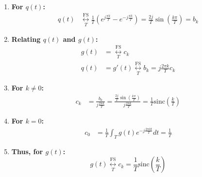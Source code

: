 \begin{example}
\begin{enumerate}
        \item \textbf{For \( q(t) \):}
        \begin{align*}
        q(t) &\underset{T}{\overset{\text{FS}}{\longleftrightarrow}} \frac{1}{T} \left( e^{j \frac{\pi k}{T}} - e^{-j \frac{\pi k}{T}} \right) = \frac{2j}{T} \sin \left( \frac{k \pi}{T} \right) = b_k
        \end{align*}
    
        \item \textbf{Relating \( q(t) \) and \( g(t) \):}
        \begin{align*}
        g(t) &=  \underset{T}{\overset{\text{FS}}{\longleftrightarrow}} c_k \\
        q(t) &= g'(t) \underset{T}{\overset{\text{FS}}{\longleftrightarrow}} b_k = j \frac{2 \pi k}{T} c_k
        \end{align*}
    
        \item \textbf{For \( k \neq 0 \):}
        \begin{align*}
        c_k &= \frac{b_k}{j \frac{2 \pi k}{T}} = \frac{\frac{2j}{T} \sin \left( \frac{k \pi}{T} \right)}{j \frac{2 \pi k}{T}} = \frac{1}{T} \text{sinc} \left( \frac{k}{T} \right)
        \end{align*}
    
        \item \textbf{For \( k = 0 \):}
        \begin{align*}
        c_0 &= \frac{1}{T} \int_T g(t) e^{-j \frac{2 \pi k t}{T}} dt = \frac{1}{T}
        \end{align*}
    
        \item \textbf{Thus, for \( g(t) \):}
        \[
        g(t) \underset{T}{\overset{\text{FS}}{\longleftrightarrow}} c_k = \frac{1}{T} \text{sinc} \left( \frac{k}{T} \right)
        \]
    
    \end{enumerate}
\end{example}